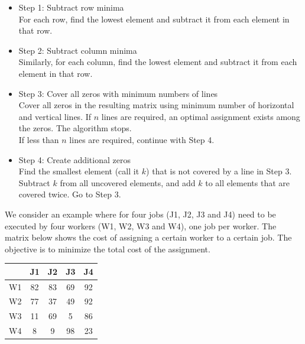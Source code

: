 \documentclass{llncs}
\begin{document}
\begin{itemize}
    \item Step 1: Subtract row minima \\
    For each row, find the lowest element and subtract it from each element in that row.
    \item Step 2: Subtract column minima \\
    Similarly, for each column, find the lowest element and subtract it from each element in that row.
    \item Step 3: Cover all zeros with minimum numbers of lines \\
    Cover all zeros in the resulting matrix using minimum number of horizontal and vertical lines. If $n$ lines are required, an optimal assignment exists among the zeros. The algorithm stops. \\
    If less than $n$ lines are required, continue with Step 4.
    \item Step 4: Create additional zeros \\
    Find the smallest element (call it $k$) that is not covered by a line in Step 3. Subtract $k$ from all uncovered elements, and add $k$ to all elements that are covered twice. Go to Step 3.
\end{itemize}

We consider an example where for four jobs (J1, J2, J3 and J4) need to be executed by four workers (W1, W2, W3 and W4), one job per worker. The matrix below shows the cost of assigning a certain worker to a certain job. The objective is to minimize the total cost of the assignment.
\begin{table}[H]
  \centering
    \begin{tabular}{ccccc}
    \toprule
          & J1    & J2    & J3    & J4 \\
    \midrule
    \phantom{2333} W1 \phantom{2333}   & \phantom{2333} 82 \phantom{2333}   & \phantom{2333} 83 \phantom{2333}   & \phantom{2333} 69 \phantom{2333}   & \phantom{2333} 92 \phantom{2333} \\
    W2    & 77    & 37    & 49    & 92 \\
    W3    & 11    & 69    & 5     & 86 \\
    W4    & 8     & 9     & 98    & 23 \\
    \bottomrule
    \end{tabular}%
\end{table}%
\end{document}
